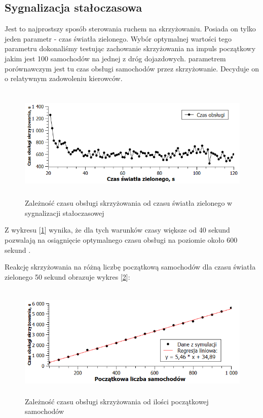 \documentclass[11pt]{aghdpl}
\begin{document}
\subsection{Sygnalizacja stałoczasowa}
Jest to najprostszy sposób sterowania ruchem na skrzyżowaniu. Posiada on tylko jeden parametr - czas światła zielonego. 
Wybór optymalnej wartości tego parametru dokonaliśmy testując zachowanie skrzyżowania na impuls początkowy jakim jest 100 samochodów na jednej z dróg dojazdowych. parametrem porównawczym jest tu czas obsługi samochodów przez skrzyżowanie. Decyduje on o relatywnym zadowoleniu kierowców.
\begin{figure}[h!]
	\centering
	\includegraphics[height=55mm]{czasobs(time).png}
	\caption{Zależność czasu obsługi skrzyżowania od czasu światła zielonego w sygnalizacji stałoczasowej}	
	\label{czasobs(time)}
\end{figure}

Z wykresu [\ref{czasobs(time)}] wynika, że dla tych warunków czasy większe od 40 sekund pozwalają na osiągnięcie optymalnego czasu obsługi na poziomie około 600 sekund \label{600}. 

Reakcję skrzyżowania na różną liczbę początkową samochodów dla czasu światła zielonego 50 sekund obrazuje wykres [\ref{czasobs(ilosc)}]:

\begin{figure}[h!]
	\centering
	\includegraphics[height=55mm]{czasobs(ilosc).png}
	\caption{Zależność czasu obsługi skrzyżowania od ilości początkowej samochodów}	
	\label{czasobs(ilosc)}
\end{figure} 
\end{document}
